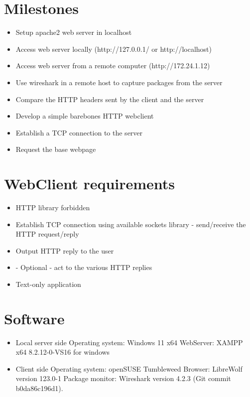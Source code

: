 \documentclass[11pt,a4paper]{report}
\begin{document}
    \section{Milestones}
        \begin{itemize}
            \item Setup apache2 web server in localhost
            \item Access web server locally (http://127.0.0.1/ or http://localhost)
            \item Access web server from a remote computer (http://172.24.1.12)
            \item Use wireshark in a remote host to capture packages from the server
            \item Compare the HTTP headers sent by the client and the server
            \item Develop a simple barebones HTTP webclient
            \item Establish a TCP connection to the server
            \item Request the base webpage
        \end{itemize}
        
    \section{WebClient requirements}
        \begin{itemize}
            \item HTTP library forbidden
            \item Establish TCP connection using available sockets library - send/receive the HTTP request/reply
            \item Output HTTP reply to the user
            \item - Optional - act to the various HTTP replies
            \item Text-only application
        \end{itemize}

    \section{Software}
        \begin{itemize}
            \item Local server side
                \subitem Operating system: Windows 11 x64
                \subitem WebServer: XAMPP x64 8.2.12-0-VS16 for windows
            \item Client side
                \subitem Operating system: openSUSE Tumbleweed
                \subitem Browser: LibreWolf version 123.0-1
                \subitem Package monitor: Wireshark version 4.2.3 (Git commit b0da86c196d1).
        \end{itemize}
\end{document}
